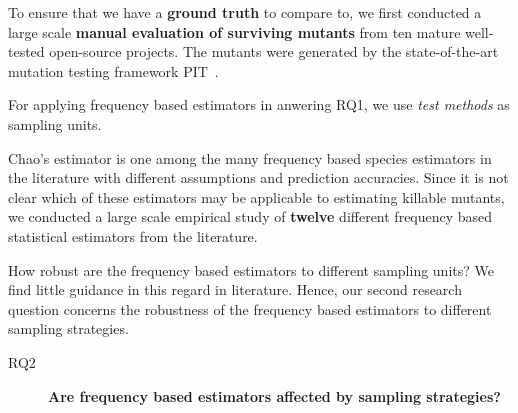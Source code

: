 \documentclass[sigconf,review,anonymous]{acmart}
\newcommand{\estimatorCount}{twelve\xspace}
\newcommand{\projectCount}{ten\xspace}
\newcounter{todocounter}
\newcommand{\todo}[1]{\marginpar{$|$}\textcolor{red}{\stepcounter{todocounter}\footnote[\thetodocounter]{\textcolor{red}{\textbf{TODO }}\textit{#1}}}}
\newcommand{\PIT}{\textsc{PIT}\xspace}
\renewcommand{\todo}[1]{}
\begin{document}
To ensure that we have a \textbf{ground truth} to compare to, we first conducted
a large scale \textbf{manual evaluation of surviving mutants} from \projectCount
mature well-tested open-source projects. The mutants were generated by
the state-of-the-art mutation testing framework \PIT~\cite{pit}.

For applying frequency based estimators in anwering RQ1, we use \emph{test methods}
as sampling units.

Chao's estimator is one among the many frequency based species estimators in
the literature with different assumptions and prediction accuracies.
Since it is not clear which of these estimators
may be applicable to estimating killable mutants, we conducted a large scale
empirical study of \textbf{\estimatorCount} different frequency based statistical estimators from
the literature.

How robust are the frequency based estimators to different sampling units? We
find little guidance in this regard in literature.
Hence, our second
research question concerns the robustness of the frequency based estimators to
different sampling strategies.

\begin{description}
  \item[RQ2] \textbf{Are frequency based estimators affected by sampling strategies?}
\end{description}
\end{document}
